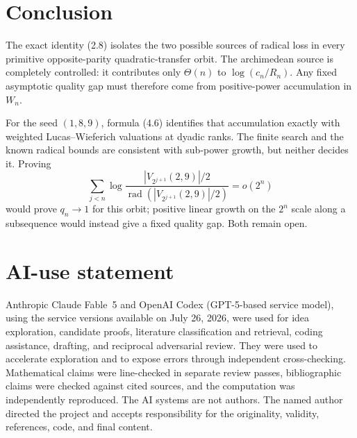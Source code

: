 \documentclass[11pt]{article}
\theoremstyle{remark}
\newcommand{\rad}{\operatorname{rad}}
\begin{document}
\section{Conclusion}

The exact identity (2.8) isolates the two possible sources of radical
loss in every primitive opposite-parity quadratic-transfer orbit.  The
archimedean source is completely controlled: it contributes only
\(\Theta(n)\) to \(\log(c_n/R_n)\).  Any fixed asymptotic quality gap
must therefore come from positive-power accumulation in \(W_n\).

For the seed \((1,8,9)\), formula (4.6) identifies that accumulation
exactly with weighted Lucas--Wieferich valuations at dyadic ranks.  The
finite search and the known radical bounds are consistent with
sub-power growth, but neither decides it.  Proving
\[
 \sum_{j<n}\log\frac{|V_{2^{j+1}}(2,9)|/2}
                         {\rad(|V_{2^{j+1}}(2,9)|/2)}
 =o(2^n)
\]
would prove \(q_n\to1\) for this orbit; positive linear growth on the
\(2^n\) scale along a subsequence would instead give a fixed quality
gap.  Both remain open.

\section*{AI-use statement}

Anthropic Claude Fable~5 and OpenAI Codex (GPT-5-based service model),
using the service versions available on July 26, 2026, were used for
idea exploration, candidate proofs, literature classification and
retrieval, coding assistance, drafting, and reciprocal adversarial
review.  They were used to accelerate exploration and to expose errors
through independent cross-checking.  Mathematical claims were
line-checked in separate review passes, bibliographic claims were
checked against cited sources, and the computation was independently
reproduced.  The AI systems are not authors.  The named author directed
the project and accepts responsibility for the originality, validity,
references, code, and final content.
\end{document}
